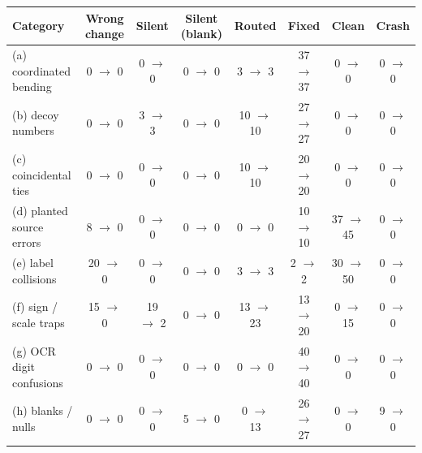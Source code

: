 \begin{center}
\begin{tabular}{lccccccc}
\toprule
Category & Wrong change & Silent & Silent (blank) & Routed & Fixed & Clean & Crash \\
\midrule
(a) coordinated bending & 0 $\rightarrow$ 0 & 0 $\rightarrow$ 0 & 0 $\rightarrow$ 0 & 3 $\rightarrow$ 3 & 37 $\rightarrow$ 37 & 0 $\rightarrow$ 0 & 0 $\rightarrow$ 0 \\
(b) decoy numbers & 0 $\rightarrow$ 0 & 3 $\rightarrow$ 3 & 0 $\rightarrow$ 0 & 10 $\rightarrow$ 10 & 27 $\rightarrow$ 27 & 0 $\rightarrow$ 0 & 0 $\rightarrow$ 0 \\
(c) coincidental ties & 0 $\rightarrow$ 0 & 0 $\rightarrow$ 0 & 0 $\rightarrow$ 0 & 10 $\rightarrow$ 10 & 20 $\rightarrow$ 20 & 0 $\rightarrow$ 0 & 0 $\rightarrow$ 0 \\
(d) planted source errors & 8 $\rightarrow$ 0 & 0 $\rightarrow$ 0 & 0 $\rightarrow$ 0 & 0 $\rightarrow$ 0 & 10 $\rightarrow$ 10 & 37 $\rightarrow$ 45 & 0 $\rightarrow$ 0 \\
(e) label collisions & 20 $\rightarrow$ 0 & 0 $\rightarrow$ 0 & 0 $\rightarrow$ 0 & 3 $\rightarrow$ 3 & 2 $\rightarrow$ 2 & 30 $\rightarrow$ 50 & 0 $\rightarrow$ 0 \\
(f) sign / scale traps & 15 $\rightarrow$ 0 & 19 $\rightarrow$ 2 & 0 $\rightarrow$ 0 & 13 $\rightarrow$ 23 & 13 $\rightarrow$ 20 & 0 $\rightarrow$ 15 & 0 $\rightarrow$ 0 \\
(g) OCR digit confusions & 0 $\rightarrow$ 0 & 0 $\rightarrow$ 0 & 0 $\rightarrow$ 0 & 0 $\rightarrow$ 0 & 40 $\rightarrow$ 40 & 0 $\rightarrow$ 0 & 0 $\rightarrow$ 0 \\
(h) blanks / nulls & 0 $\rightarrow$ 0 & 0 $\rightarrow$ 0 & 5 $\rightarrow$ 0 & 0 $\rightarrow$ 13 & 26 $\rightarrow$ 27 & 0 $\rightarrow$ 0 & 9 $\rightarrow$ 0 \\
\bottomrule
\end{tabular}
\end{center}

